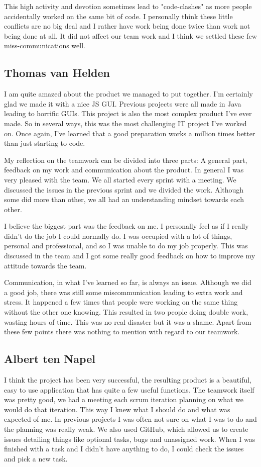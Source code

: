 \documentclass[a4paper]{article}
\begin{document}
This high activity and devotion sometimes lead to "code-clashes" as more people accidentally worked on the same bit of code. I personally think these little conflicts are no big deal and I rather have work being done twice than work not being done at all. It did not affect our team work and I think we settled these few miss-communications well.

\subsection{Thomas van Helden}
I am quite amazed about the product we managed to put together. I'm certainly glad we made it with a nice JS GUI. Previous projects were all made in Java leading to horrific GUIs. This project is also the most complex product I've ever made. So in several ways, this was the most challenging IT project I've worked on. Once again, I've learned that a good preparation works a million times better than just starting to code. 

My reflection on the teamwork can be divided into three parts: A general part, feedback on my work and communication about the product.
In general I was very pleased with the team. We all started every sprint with a meeting. We discussed the issues in the previous sprint and we divided the work. Although some did more than other, we all had an understanding mindset towards each other.

I believe the biggest part was the feedback on me. I personally feel as if I really didn't do the job I could normally do. I was occupied with a lot of things, personal and professional, and so I was unable to do my job properly. This was discussed in the team and I got some really good feedback on how to improve my attitude towards the team. 

Communication, in what I've learned so far, is always an issue. Although we did a good job, there was still some miscommunication leading to extra work and stress. It happened a few times that people were working on the same thing without the other one knowing. This resulted in two people doing double work, wasting hours of time. This was no real disaster but it was a shame. Apart from these few points there was nothing to mention with regard to our teamwork.

\subsection{Albert ten Napel}
I think the project has been very successful, the resulting product is a beautiful, easy to use application that has quite a few useful functions. The teamwork itself was pretty good, we had a meeting each scrum iteration planning on what we would do that iteration. This way I knew what I should do and what was expected of me. In previous projects I was often not sure on what I was to do and the planning was really weak. We also used GitHub, which allowed us to create issues detailing things like optional tasks, bugs and unassigned work. When I was finished with a task and I didn't have anything to do, I could check the issues and pick a new task.
\end{document}
